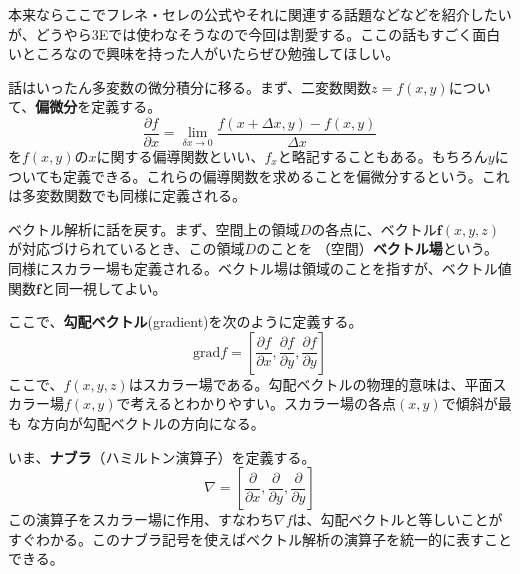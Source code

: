 \documentclass[a4j,dvipdfmx]{jsarticle}
\begin{document}
            本来ならここでフレネ・セレの公式やそれに関連する話題などなどを紹介したいが、どうやら3Eでは使わなそうなので今回は割愛する。ここの話もすごく面白いところなので興味を持った人がいたらぜひ勉強してほしい。

            話はいったん多変数の微分積分に移る。まず、二変数関数$z=f(x,y)$について、\textbf{偏微分}を定義する。
            \begin{equation}
                \frac{\partial f}{\partial x}=\lim_{\delta x\to 0}\frac{f(x+\Delta x,y)-f(x,y)}{\Delta x}
            \end{equation}
            を$f(x,y)$の$x$に関する偏導関数といい、$f_x$と略記することもある。もちろん$y$についても定義できる。これらの偏導関数を求めることを偏微分するという。これは多変数関数でも同様に定義される。

            ベクトル解析に話を戻す。まず、空間上の領域$D$の各点に、ベクトル$\bm{f}(x,y,z)$が対応づけられているとき、この領域$D$のことを
            （空間）\textbf{ベクトル場}という。同様にスカラー場も定義される。ベクトル場は領域のことを指すが、ベクトル値関数$\bm{f}$と同一視してよい。

            ここで、\textbf{勾配ベクトル}(gradient)を次のように定義する。
            \begin{equation}
                \mathrm{grad} f = \left[\frac{\partial f}{\partial x},\frac{\partial f}{\partial y},\frac{\partial f}{\partial y}\right]
            \end{equation}
            ここで、$f(x,y,z)$はスカラー場である。勾配ベクトルの物理的意味は、平面スカラー場$f(x,y)$で考えるとわかりやすい。スカラー場の各点$(x,y)$で傾斜が最も
            な方向が勾配ベクトルの方向になる。

            いま、\textbf{ナブラ}（ハミルトン演算子）を定義する。
            \begin{equation}
                \nabla =  \left[\frac{\partial }{\partial x},\frac{\partial }{\partial y},\frac{\partial }{\partial y}\right]
            \end{equation}
            この演算子をスカラー場に作用、すなわち$\nabla f$は、勾配ベクトルと等しいことがすぐわかる。このナブラ記号を使えばベクトル解析の演算子を統一的に表すことできる。
\end{document}
